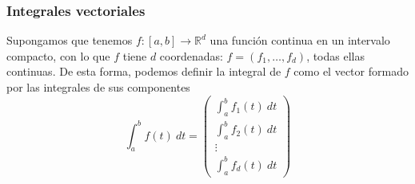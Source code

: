 \subsubsection{Integrales vectoriales}
Supongamos que tenemos $f:[a,b]\rightarrow \mathbb{R}^d$ una función continua en un intervalo compacto, con lo que $f$ tiene $d$ coordenadas: $f=(f_1,\ldots,f_d)$, todas ellas continuas. De esta forma, podemos definir la integral de $f$ como el vector formado por las integrales de sus componentes
\begin{equation*}
    \int_{a}^{b} f(t)~dt  = \left(\begin{array}{c}
        \displaystyle\int_{a}^{b} f_1(t)~dt  \\
        \displaystyle\int_{a}^{b} f_2(t)~dt  \\
        \vdots \\
        \displaystyle\int_{a}^{b} f_d(t)~dt  
    \end{array}\right)
\end{equation*}


